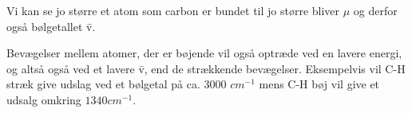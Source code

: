 Vi kan se jo større et atom som carbon er bundet til jo større bliver $\mu$ og derfor også bølgetallet \={v}.

Bevægelser mellem atomer, der er bøjende vil også optræde ved en lavere energi, og altså også ved et lavere \={v}, end de strækkende bevægelser. Eksempelvis vil C-H stræk give udslag ved et bølgetal på ca. 3000 $cm^{-1}$ mens C-H bøj vil give et udsalg omkring $1340cm^{-1}$.
